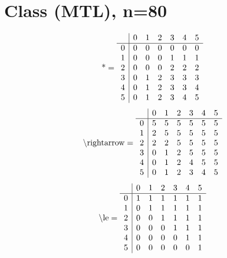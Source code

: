 \documentclass[11pt]{article}
\begin{document}
\section{Class (MTL), n=80}
\[\text{*} = 
\begin{array}{r | r r r r r r}
 & 0 & 1 & 2 & 3 & 4 & 5 \\ \hline
0 & 0 & 0 & 0 & 0 & 0 & 0 \\
1 & 0 & 0 & 0 & 1 & 1 & 1 \\
2 & 0 & 0 & 0 & 2 & 2 & 2 \\
3 & 0 & 1 & 2 & 3 & 3 & 3 \\
4 & 0 & 1 & 2 & 3 & 3 & 4 \\
5 & 0 & 1 & 2 & 3 & 4 & 5 \\
\end{array}
\]
\[\text{\textbackslash rightarrow} = 
\begin{array}{r | r r r r r r}
 & 0 & 1 & 2 & 3 & 4 & 5 \\ \hline
0 & 5 & 5 & 5 & 5 & 5 & 5 \\
1 & 2 & 5 & 5 & 5 & 5 & 5 \\
2 & 2 & 2 & 5 & 5 & 5 & 5 \\
3 & 0 & 1 & 2 & 5 & 5 & 5 \\
4 & 0 & 1 & 2 & 4 & 5 & 5 \\
5 & 0 & 1 & 2 & 3 & 4 & 5 \\
\end{array}
\]
\[\text{\textbackslash le} = 
\begin{array}{r | r r r r r r}
 & 0 & 1 & 2 & 3 & 4 & 5 \\ \hline
0 & 1 & 1 & 1 & 1 & 1 & 1 \\
1 & 0 & 1 & 1 & 1 & 1 & 1 \\
2 & 0 & 0 & 1 & 1 & 1 & 1 \\
3 & 0 & 0 & 0 & 1 & 1 & 1 \\
4 & 0 & 0 & 0 & 0 & 1 & 1 \\
5 & 0 & 0 & 0 & 0 & 0 & 1 \\
\end{array}
\]
\end{document}
